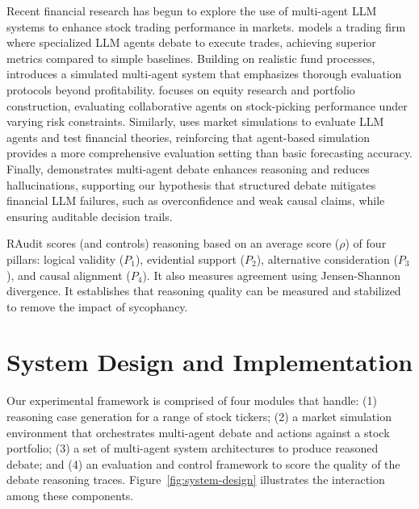 \documentclass{article}
\begin{document}
Recent financial research has begun to explore the use of multi-agent LLM systems to enhance stock trading performance in markets. \cite{tradingagents2024} models a trading firm where specialized LLM agents debate to execute trades, achieving superior metrics compared to simple baselines. Building on realistic fund processes, \cite{quantagents2025} introduces a simulated multi-agent system that emphasizes thorough evaluation protocols beyond profitability. \cite{alphaagents2025} focuses on equity research and portfolio construction, evaluating collaborative agents on stock-picking performance under varying risk constraints. Similarly, \cite{lopezlira2025llmtrade} uses market simulations to evaluate LLM agents and test financial theories, reinforcing that agent-based simulation provides a more comprehensive evaluation setting than basic forecasting accuracy. Finally, \cite{du2023multidebate} demonstrates multi-agent debate enhances reasoning and reduces hallucinations, supporting our hypothesis that structured debate mitigates financial LLM failures, such as overconfidence and weak causal claims, while ensuring auditable decision trails.

RAudit \cite{raudit} scores (and controls) reasoning based on an average score ($\rho$) of four pillars: logical validity ($P_1$), evidential support ($P_2$), alternative consideration ($P_3$), and causal alignment ($P_4$). It also measures agreement using Jensen-Shannon divergence. It establishes that reasoning quality can be measured and stabilized to remove the impact of sycophancy.

\vspace{-8pt}
\section{System Design and Implementation}
\label{sys_des}
\vspace{-8pt}

Our experimental framework is comprised of four modules that handle: (1) reasoning case generation for a range of stock tickers; (2) a market simulation environment that orchestrates multi-agent debate and actions against a stock portfolio; (3) a set of multi-agent system architectures to produce reasoned debate; and (4) an evaluation and control framework to score the quality of the debate reasoning traces. Figure~\ref{fig:system-design} illustrates the interaction among these components.
\end{document}
